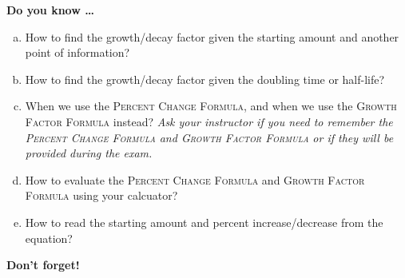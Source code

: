\newpage



\bigskip

\noindent \textbf{Do you know \ldots} %

\begin{enumerate} [(a)]
\item How to find the growth/decay factor given the starting amount and another point of information? 
\item How to find the growth/decay factor given the doubling time or half-life? 
\item When we use the \textsc{Percent Change Formula}, and when we use the \textsc{Growth Factor Formula} instead?  \emph{Ask your instructor if you need to remember the \textsc{Percent Change Formula} and \textsc{Growth Factor Formula} or if they will be provided during the exam.}
\item How to evaluate the \textsc{Percent Change Formula} and \textsc{Growth Factor Formula} using your calcuator? 
\item How to read the starting amount and percent increase/decrease from the equation? 
\end{enumerate}

\bigskip

\noindent \textbf{Don't forget!}
